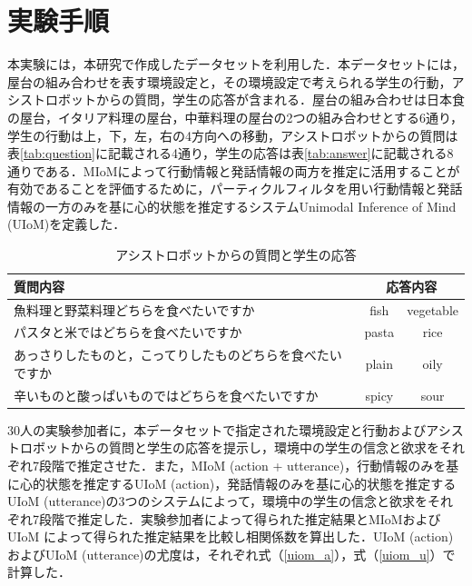 \section{実験手順}

\par
本実験には，本研究で作成したデータセットを利用した．本データセットには，屋台の組み合わせを表す環境設定と，その環境設定で考えられる学生の行動，アシストロボットからの質問，学生の応答が含まれる．屋台の組み合わせは日本食の屋台，イタリア料理の屋台，中華料理の屋台の2つの組み合わせとする6通り，学生の行動は上，下，左，右の4方向への移動，アシストロボットからの質問は表\ref{tab:question}に記載される4通り，学生の応答は表\ref{tab:answer}に記載される8通りである．MIoMによって行動情報と発話情報の両方を推定に活用することが有効であることを評価するために，パーティクルフィルタを用い行動情報と発話情報の一方のみを基に心的状態を推定するシステムUnimodal Inference of Mind (UIoM)を定義した．


\begin{table}[htb]
  \begin{center}
  \caption{アシストロボットからの質問と学生の応答}
  \label{tab:q_a}
  \begin{tabular}{lcc} \hline
    質問内容&\multicolumn{2}{c}{応答内容}\\\hline
    魚料理と野菜料理どちらを食べたいですか&fish&vegetable\\
    パスタと米ではどちらを食べたいですか&pasta&rice\\
    あっさりしたものと，こってりしたものどちらを食べたいですか&plain&oily\\
    辛いものと酸っぱいものではどちらを食べたいですか&spicy&sour\\\hline
  \end{tabular}
\end{center}
\end{table}



\par
30人の実験参加者に，本データセットで指定された環境設定と行動およびアシストロボットからの質問と学生の応答を提示し，環境中の学生の信念と欲求をそれぞれ7段階で推定させた．また，MIoM (action + utterance)，行動情報のみを基に心的状態を推定するUIoM (action)，発話情報のみを基に心的状態を推定するUIoM (utterance)の3つのシステムによって，環境中の学生の信念と欲求をそれぞれ7段階で推定した．実験参加者によって得られた推定結果とMIoMおよびUIoM によって得られた推定結果を比較し相関係数を算出した．UIoM (action)およびUIoM (utterance)の尤度は，それぞれ式（\ref{uiom_a}），式（\ref{uiom_u}）で計算した．


